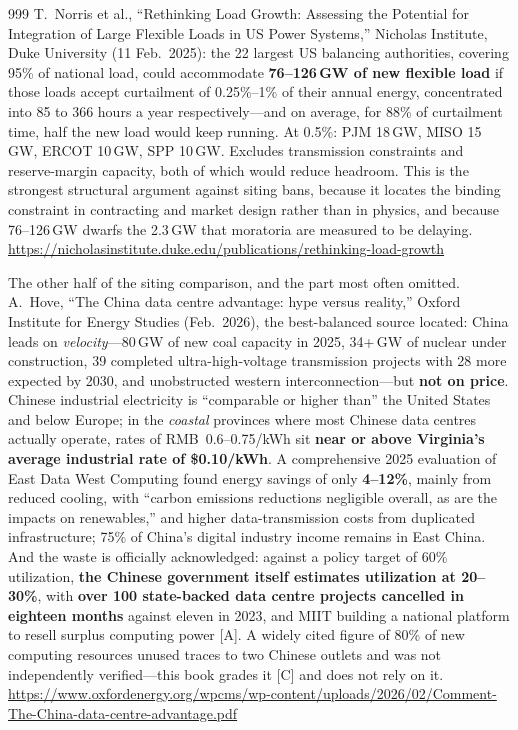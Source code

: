 \begin{thebibliography}{999}
 T.~Norris et al., ``Rethinking Load Growth: Assessing the Potential for Integration of Large Flexible Loads in US Power Systems,'' Nicholas Institute, Duke University (11 Feb.\ 2025): the 22 largest US balancing authorities, covering 95\% of national load, could accommodate \textbf{76--126\,GW of new flexible load} if those loads accept curtailment of 0.25\%--1\% of their annual energy, concentrated into 85 to 366 hours a year respectively---and on average, for 88\% of curtailment time, half the new load would keep running. At 0.5\%: PJM 18\,GW, MISO 15\,GW, ERCOT 10\,GW, SPP 10\,GW. Excludes transmission constraints and reserve-margin capacity, both of which would reduce headroom. This is the strongest structural argument against siting bans, because it locates the binding constraint in contracting and market design rather than in physics, and because 76--126\,GW dwarfs the 2.3\,GW that moratoria are measured to be delaying. \url{https://nicholasinstitute.duke.edu/publications/rethinking-load-growth}

 The other half of the siting comparison, and the part most often omitted. A.~Hove, ``The China data centre advantage: hype versus reality,'' Oxford Institute for Energy Studies (Feb.\ 2026), the best-balanced source located: China leads on \emph{velocity}---80\,GW of new coal capacity in 2025, 34+\,GW of nuclear under construction, 39 completed ultra-high-voltage transmission projects with 28 more expected by 2030, and unobstructed western interconnection---but \textbf{not on price}. Chinese industrial electricity is ``comparable or higher than'' the United States and below Europe; in the \emph{coastal} provinces where most Chinese data centres actually operate, rates of RMB~0.6--0.75/kWh sit \textbf{near or above Virginia's average industrial rate of \$0.10/kWh}. A comprehensive 2025 evaluation of East Data West Computing found energy savings of only \textbf{4--12\%}, mainly from reduced cooling, with ``carbon emissions reductions negligible overall, as are the impacts on renewables,'' and higher data-transmission costs from duplicated infrastructure; 75\% of China's digital industry income remains in East China. And the waste is officially acknowledged: against a policy target of 60\% utilization, \textbf{the Chinese government itself estimates utilization at 20--30\%}, with \textbf{over 100 state-backed data centre projects cancelled in eighteen months} against eleven in 2023, and MIIT building a national platform to resell surplus computing power [A]. A widely cited figure of 80\% of new computing resources unused traces to two Chinese outlets and was not independently verified---this book grades it [C] and does not rely on it. \url{https://www.oxfordenergy.org/wpcms/wp-content/uploads/2026/02/Comment-The-China-data-centre-advantage.pdf}


\end{thebibliography}
